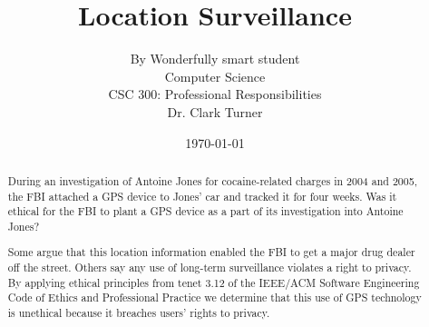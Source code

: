\documentclass[12pt]{article}
\begin{document}
\title{\vfill Location Surveillance} %
\author{
By Wonderfully smart student \vspace{10pt} \\
Computer Science \vspace{10pt} \\
CSC 300: Professional Responsibilities  \vspace{10pt} \\
Dr. Clark Turner \vspace{10pt} \\
}
\date{\today}

\maketitle

\vfill  %
\begin{abstract}
During an investigation of Antoine Jones for cocaine-related charges in 2004 and 2005, the FBI attached a GPS device to Jones' car and tracked it for four weeks. \cite{maynarddecision} Was it ethical for the FBI to plant a GPS device as a part of its investigation into Antoine Jones?

Some argue that this location information enabled the FBI to get a major drug dealer off the street. \cite{huffingtonsurveillance} Others say any use of long-term surveillance violates a right to
privacy. \cite{chillingeffect} By applying ethical principles from tenet 3.12 of the IEEE/ACM Software Engineering Code of Ethics and Professional Practice 
we determine that this use of GPS technology is unethical because it breaches users' rights to privacy.
\end{abstract}

\thispagestyle{empty} %
\newpage


\setcounter{page}{1}
\tableofcontents
\newpage
\end{document}
